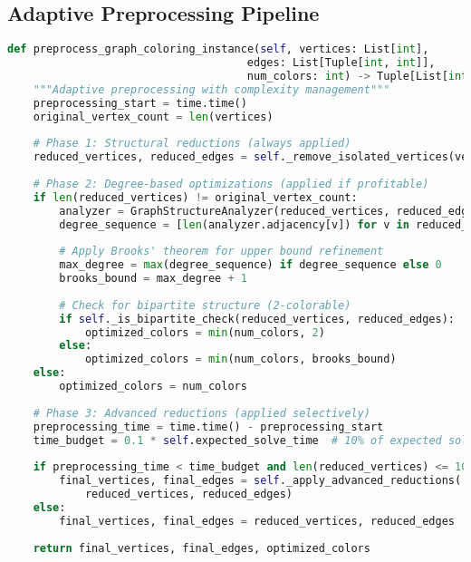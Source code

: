 \subsection{Adaptive Preprocessing Pipeline}
\label{appendix:adaptive-preprocessing}

\begin{lstlisting}[language=Python, caption=Adaptive Preprocessing Pipeline]
def preprocess_graph_coloring_instance(self, vertices: List[int], 
                                     edges: List[Tuple[int, int]], 
                                     num_colors: int) -> Tuple[List[int], List[Tuple[int, int]], int]:
    """Adaptive preprocessing with complexity management"""
    preprocessing_start = time.time()
    original_vertex_count = len(vertices)
    
    # Phase 1: Structural reductions (always applied)
    reduced_vertices, reduced_edges = self._remove_isolated_vertices(vertices, edges)
    
    # Phase 2: Degree-based optimizations (applied if profitable)
    if len(reduced_vertices) != original_vertex_count:
        analyzer = GraphStructureAnalyzer(reduced_vertices, reduced_edges)
        degree_sequence = [len(analyzer.adjacency[v]) for v in reduced_vertices]
        
        # Apply Brooks' theorem for upper bound refinement
        max_degree = max(degree_sequence) if degree_sequence else 0
        brooks_bound = max_degree + 1
        
        # Check for bipartite structure (2-colorable)
        if self._is_bipartite_check(reduced_vertices, reduced_edges):
            optimized_colors = min(num_colors, 2)
        else:
            optimized_colors = min(num_colors, brooks_bound)
    else:
        optimized_colors = num_colors
    
    # Phase 3: Advanced reductions (applied selectively)
    preprocessing_time = time.time() - preprocessing_start
    time_budget = 0.1 * self.expected_solve_time  # 10% of expected solve time
    
    if preprocessing_time < time_budget and len(reduced_vertices) <= 100:
        final_vertices, final_edges = self._apply_advanced_reductions(
            reduced_vertices, reduced_edges)
    else:
        final_vertices, final_edges = reduced_vertices, reduced_edges
    
    return final_vertices, final_edges, optimized_colors
\end{lstlisting}

